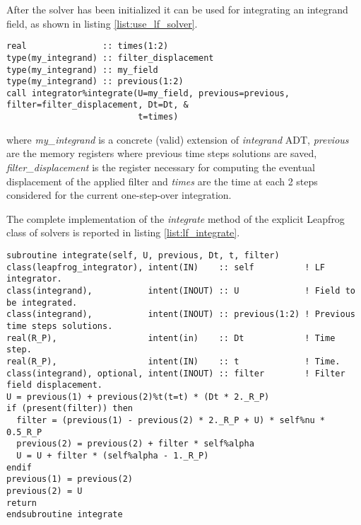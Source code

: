 After the solver has been initialized it can be used for integrating an integrand field, as shown in listing \ref{list:use_lf_solver}.

\begin{lstlisting}[firstnumber=1,style=code,caption={example of usage of a Leapfrog integrator},label={list:use_lf_solver}]
real               :: times(1:2)
type(my_integrand) :: filter_displacement
type(my_integrand) :: my_field
type(my_integrand) :: previous(1:2)
call integrator%integrate(U=my_field, previous=previous, filter=filter_displacement, Dt=Dt, &
                          t=times)
\end{lstlisting}
where \emph{my\_integrand} is a concrete (valid) extension of \emph{integrand} ADT, \emph{previous} are the memory registers where previous time steps solutions are saved, \emph{filter\_displacement} is the register necessary for computing the eventual displacement of the applied filter and \emph{times} are the time at each 2 steps considered for the current one-step-over integration.

The complete implementation of the \emph{integrate} method of the explicit Leapfrog class of solvers is reported in listing \ref{list:lf_integrate}.

\begin{lstlisting}[firstnumber=1,style=code,caption={implementation of the \emph{integrate} method of explicit Leapfrog class},label={list:lf_integrate}]
subroutine integrate(self, U, previous, Dt, t, filter)
class(leapfrog_integrator), intent(IN)    :: self          ! LF integrator.
class(integrand),           intent(INOUT) :: U             ! Field to be integrated.
class(integrand),           intent(INOUT) :: previous(1:2) ! Previous time steps solutions.
real(R_P),                  intent(in)    :: Dt            ! Time step.
real(R_P),                  intent(IN)    :: t             ! Time.
class(integrand), optional, intent(INOUT) :: filter        ! Filter field displacement.
U = previous(1) + previous(2)%t(t=t) * (Dt * 2._R_P)
if (present(filter)) then
  filter = (previous(1) - previous(2) * 2._R_P + U) * self%nu * 0.5_R_P
  previous(2) = previous(2) + filter * self%alpha
  U = U + filter * (self%alpha - 1._R_P)
endif
previous(1) = previous(2)
previous(2) = U
return
endsubroutine integrate
\end{lstlisting}

